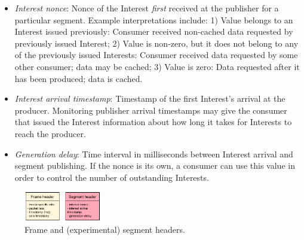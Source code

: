 \documentclass{icn/sig-alternate-2013} %
\begin{document}
\begin{itemize} [label={}]
\item \textit{Interest nonce}: Nonce of the Interest \textit{first} received at the publisher for a particular segment. Example interpretations include: 1) Value belongs to an Interest issued previously: Consumer received non-cached data requested by previously issued Interest; 2) Value is non-zero, but it does not belong to any of the previously issued Interests: Consumer received data requested by some other consumer; data may be cached; 3) Value is zero: Data requested after it has been produced; data is cached.
\item \textit{Interest arrival timestamp}: Timestamp of the first Interest's arrival at the producer. Monitoring publisher arrival timestamps may give the consumer that issued the Interest information about how long it takes for Interests to reach the producer. %
\item \textit{Generation delay}: Time interval in milliseconds between Interest arrival and segment publishing. If the nonce is its own, a consumer can use this value in order to control the number of outstanding Interests. %
\end{itemize}



%

%


\begin{figure}[t!]
\centering
\includegraphics[width=0.3\textwidth]{data-struct}
\vspace{-4pt}
\caption{Frame and (experimental) segment headers.}
\label{fig:data-struct}
\end{figure}
\end{document}

